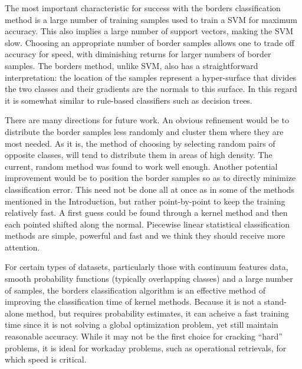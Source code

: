 The most important characteristic for success with the borders classification 
method is a large number of training samples
used to train a SVM for maximum accuracy.
This also implies a large number of support vectors, making the
SVM slow.
Choosing an appropriate number of border samples allows one to trade off
accuracy for speed, with diminishing returns for larger numbers of border samples.
The borders method, unlike SVM, also has a straightforward interpretation:
the location of the samples represent a hyper-surface that divides the two
classes and their gradients are the normals to this surface.
In this regard it is somewhat similar to rule-based classifiers such as
decision trees.

There are many directions for future work.
An obvious refinement would be to distribute the border samples less 
randomly and cluster them where they are most needed.
As it is, the method of choosing by selecting random pairs of opposite
classes, will tend to distribute them in areas of high density.
The current, random method was found to work well enough.
Another potential improvement would be to position the border samples
so as to directly minimize classification error.
This need not be done all at once as in some of the methods mentioned
in the Introduction, but rather point-by-point to keep the training
relatively fast.
A first guess could be found through a kernel method and then each
pointed shifted along the normal.
Piecewise linear statistical classification methods are simple, 
powerful and fast and we think they should receive more attention.

For certain types of datasets, particularly those with continuum features
data, smooth probability functions (typically overlapping classes) and a large number of samples, 
the borders classification algorithm is an 
effective method of improving the classification time of kernel methods.
Because it is not a stand-alone method, but requires probability estimates,
it can acheive a fast training time since it is not solving a global
optimization problem, yet still maintain reasonable accuracy.
While it may not be the first choice for cracking ``hard'' problems, it
is ideal for workaday problems, such as operational retrievals,
for which speed is critical.

